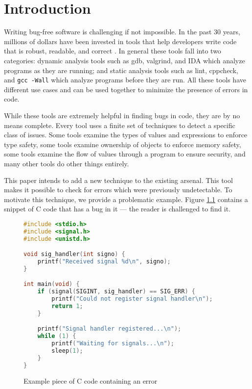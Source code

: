\chapter{Introduction}\label{sec:intro}

Writing bug-free software is challenging if not impossible.  In the past 30 years, millions of dollars have been invested in tools that help developers write code that is robust, readable, and correct \cite{staticanal}.  In general these tools fall into two categories:  dynamic analysis tools such as gdb, valgrind, and IDA which analyze programs as they are running; and static analysis tools such as lint, cppcheck, and \lstinline{gcc -Wall} which analyze programs before they are run.  All these tools have different use cases and can be used together to minimize the presence of errors in code.

While these tools are extremely helpful in finding bugs in code, they are by no means complete.  Every tool uses a finite set of techniques to detect a specific class of issues.  Some tools examine the types of values and expressions to enforce type safety\cite{staticanal}, some tools examine ownership of objects to enforce memory safety\cite{rust-is-dope}, some tools examine the flow of values through a program to ensure security\cite{jqual-inference}, and many other tools do other things entirely.  

This paper intends to add a new technique to the existing arsenal.  This tool makes it possible to check for errors which were previously undetectable.  To motivate this technique, we provide a problematic example.  Figure \ref{lst:intro:bug} contains a snippet of C code that has a bug in it --- the reader is challenged to find it.

\begin{figure}
\begin{lstlisting}[language=C]
#include <stdio.h>
#include <signal.h>
#include <unistd.h>

void sig_handler(int signo) {
    printf("Received signal %d\n", signo);
}

int main(void) {
    if (signal(SIGINT, sig_handler) == SIG_ERR) {
        printf("Could not register signal handler\n");
        return 1;
    }

    printf("Signal handler registered...\n");
    while (1) {
        printf("Waiting for signals...\n");
        sleep(1);
    }
}
\end{lstlisting}
    \caption{Example piece of C code containing an error}
    \label{lst:intro:bug}
\end{figure}

